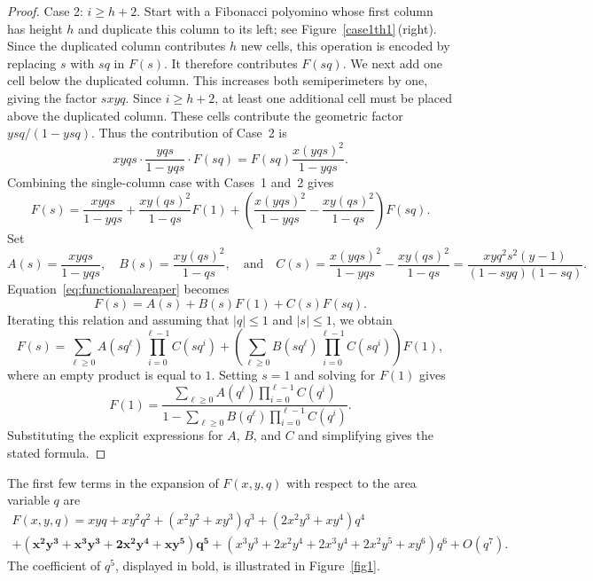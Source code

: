 \documentclass[12pt]{amsart}
\theoremstyle{plain}
\theoremstyle{definition}
\begin{document}
\begin{proof}
Case 2: $i\geq h+2$. Start with a Fibonacci polyomino whose first column has height $h$ and duplicate this column to its left; see Figure~\ref{case1th1}\,(right). Since the duplicated column contributes $h$ new cells, this operation is encoded by replacing $s$ with $sq$ in $F(s)$. It therefore contributes  $F(sq)$. We next add one cell below the duplicated column. This  increases both semiperimeters by one, giving the factor $sxyq$. Since $i\geq h+2$, at least one additional cell must be placed above the duplicated column. These cells  contribute the geometric factor $ysq/(1-ysq)$.  Thus the contribution of Case~2 is
\[
xyqs\cdot \frac{yqs}{1 - yqs} \cdot F(sq)
= F(s q)\frac{x(yqs)^{2}}{1 - yqs}.
\]
Combining the single-column case with Cases~1 and~2 gives
\begin{equation}\label{eq:functionalareaper}
F(s)
= \frac{xyqs}{1-yqs} + \frac{xy (qs)^{2}}{1-qs} F(1)
+ \left( \frac{x (yqs)^{2}}{1-yqs} - \frac{xy(qs)^{2}}{1-qs} \right) F(sq).
\end{equation}
Set
\[
A(s)= \frac{xyqs}{1-yqs},\quad
B(s)= \frac{xy (qs)^{2}}{1-qs},\quad \text{and} \quad 
C(s)= \frac{x (yqs)^{2}}{1-yqs} - \frac{xy(qs)^{2}}{1-qs}=\frac{xyq^2s^2(y-1)}{(1-syq)(1-sq)}.
\]
Equation~\eqref{eq:functionalareaper} becomes
\[
F(s)=A(s)+B(s)F(1)+C(s)F(sq).
\]
Iterating this relation  and  assuming that $|q|\leq 1$ and $|s|\leq 1$,  we obtain
\[
F(s)
= \sum_{\ell\geq 0} A(s q^{\ell}) \prod_{i=0}^{\ell-1} C(s q^{i})
+ \left( \sum_{\ell\geq 0} B(s q^{\ell}) \prod_{i=0}^{\ell-1} C(s q^{i}) \right) F(1),
\]
where an empty product is equal to $1$. Setting $s=1$ and solving for $F(1)$ gives
\[
F(1)
= \frac{\sum_{\ell\geq 0} A(q^{\ell}) \prod_{i=0}^{\ell-1} C(q^{i})}
       {1 - \sum_{\ell\geq 0} B(q^{\ell}) \prod_{i=0}^{\ell-1} C(q^{i})}.
\]
Substituting the explicit expressions for $A$, $B$, and $C$ and simplifying gives the stated formula.
\end{proof}

The first few terms in the expansion of $F(x,y,q)$ with respect to the area variable $q$ are
\begin{multline*}
    F(x,y,q)=x y q + x y^2 q^2 + (x^2 y^2 + x y^3) q^3 + (2 x^2 y^3 + 
    x y^4) q^4 \\+ \bm{(x^2 y^3 + x^3 y^3 + 2 x^2 y^4 + 
    x y^5) q^5} + (x^3 y^3 + 2 x^2 y^4 + 2 x^3 y^4 + 2 x^2 y^5 + 
    x y^6) q^6 + O(q^7).
\end{multline*}
The coefficient of $q^5$, displayed in bold, is illustrated in
Figure~\ref{fig1}.
\end{document}
